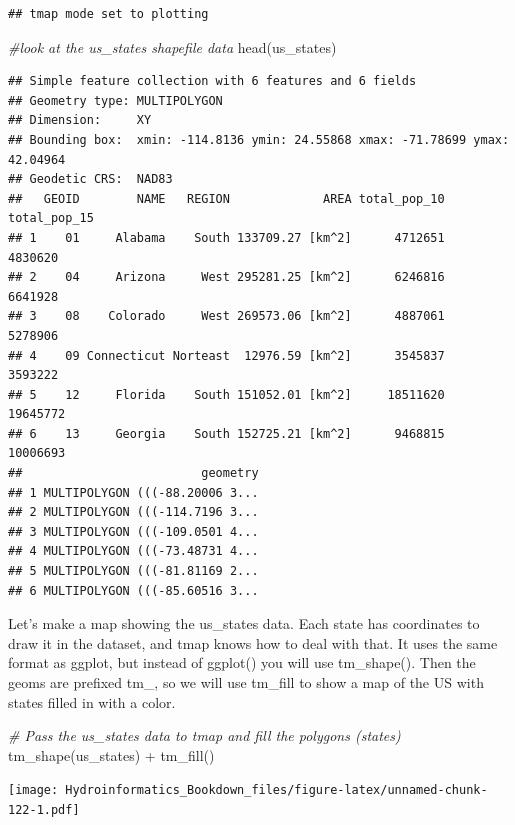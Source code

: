 \documentclass[
]{book}
\newenvironment{Shaded}{\begin{snugshade}}{\end{snugshade}}
\newcommand{\CommentTok}[1]{\textcolor[rgb]{0.56,0.35,0.01}{\textit{#1}}}
\newcommand{\FunctionTok}[1]{\textcolor[rgb]{0.00,0.00,0.00}{#1}}
\newcommand{\NormalTok}[1]{#1}
\newcommand{\SpecialCharTok}[1]{\textcolor[rgb]{0.00,0.00,0.00}{#1}}
\begin{document}
\begin{verbatim}
## tmap mode set to plotting
\end{verbatim}

\begin{Shaded}
\begin{Highlighting}[]
\CommentTok{\#look at the us\_states shapefile data}
\FunctionTok{head}\NormalTok{(us\_states)}
\end{Highlighting}
\end{Shaded}

\begin{verbatim}
## Simple feature collection with 6 features and 6 fields
## Geometry type: MULTIPOLYGON
## Dimension:     XY
## Bounding box:  xmin: -114.8136 ymin: 24.55868 xmax: -71.78699 ymax: 42.04964
## Geodetic CRS:  NAD83
##   GEOID        NAME   REGION             AREA total_pop_10 total_pop_15
## 1    01     Alabama    South 133709.27 [km^2]      4712651      4830620
## 2    04     Arizona     West 295281.25 [km^2]      6246816      6641928
## 3    08    Colorado     West 269573.06 [km^2]      4887061      5278906
## 4    09 Connecticut Norteast  12976.59 [km^2]      3545837      3593222
## 5    12     Florida    South 151052.01 [km^2]     18511620     19645772
## 6    13     Georgia    South 152725.21 [km^2]      9468815     10006693
##                         geometry
## 1 MULTIPOLYGON (((-88.20006 3...
## 2 MULTIPOLYGON (((-114.7196 3...
## 3 MULTIPOLYGON (((-109.0501 4...
## 4 MULTIPOLYGON (((-73.48731 4...
## 5 MULTIPOLYGON (((-81.81169 2...
## 6 MULTIPOLYGON (((-85.60516 3...
\end{verbatim}

Let's make a map showing the us\_states data. Each state has coordinates to draw it in the dataset, and tmap knows how to deal with that. It uses the same format as ggplot, but instead of ggplot() you will use tm\_shape(). Then the geoms are prefixed tm\_, so we will use tm\_fill to show a map of the US with states filled in with a color.

\begin{Shaded}
\begin{Highlighting}[]
\CommentTok{\# Pass the us\_states data to tmap and fill the polygons (states)}
\FunctionTok{tm\_shape}\NormalTok{(us\_states) }\SpecialCharTok{+}
  \FunctionTok{tm\_fill}\NormalTok{() }
\end{Highlighting}
\end{Shaded}

\texttt{[image: Hydroinformatics\_Bookdown\_files/figure-latex/unnamed-chunk-122-1.pdf]}
\end{document}
